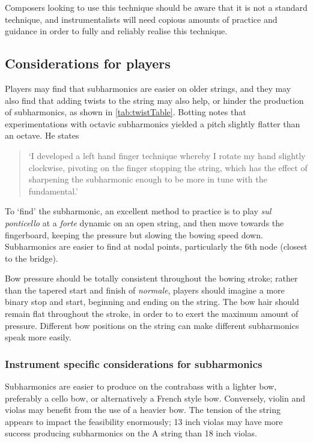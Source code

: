 Composers looking to use this technique should be aware that it is not a standard technique, and instrumentalists will need copious amounts of practice and guidance in order to fully and reliably realise this technique.

\subsection{Considerations for players}
Players may find that subharmonics are easier on older strings, and they may also find that adding twists to the string may also help, or hinder the production of subharmonics, as shown in \autoref{tab:twistTable}.\autocite[]{kimuraHowProduceSubharmonics1999}
Botting notes that experimentations with octavic subharmonics yielded a pitch slightly flatter than an octave. He states \begin{quotation}
  `I developed a left hand finger technique whereby I rotate my hand slightly clockwise, pivoting on the finger stopping the string, which has the effect of sharpening the subharmonic enough to be more in tune with the fundamental.'\autocite[111]{bottingDevelopingPersonalVocabulary2019}
\end{quotation}

To `find' the subharmonic, an excellent method to practice is to play \emph{sul ponticello} at a \emph{forte} dynamic on an open string, and then move towards the fingerboard, keeping the pressure but slowing the bowing speed down.
Subharmonics are easier to find at nodal points, particularly the 6th node (closest to the bridge).\autocite[]{appleseedFeedbackSightreadingSession2019}

Bow pressure should be totally consistent throughout the bowing stroke; rather than the tapered start and finish of \emph{normale}, players should imagine a more binary stop and start, beginning and ending on the string.
The bow hair should remain flat throughout the stroke, in order to to exert the maximum amount of pressure.\autocite[]{kimuraHowProduceSubharmonics1999}
Different bow positions on the string can make different subharmonics speak more easily.\autocite[]{kimuraHowProduceSubharmonics1999}

\subsubsection{Instrument specific considerations for subharmonics}
Subharmonics are easier to produce on the contrabass with a lighter bow, preferably a cello bow, or alternatively a French style bow.\autocite[]{longSubharmonics2019}
Conversely, violin and violas may benefit from the use of a heavier bow.\autocite[]{appleseedFeedbackSightreadingSession2019}
The tension of the string appears to impact the feasibility enormously; 13 inch violas may have more success producing subharmonics on the A string than 18 inch violas.\autocite[]{appleseedFeedbackSightreadingSession2019}



